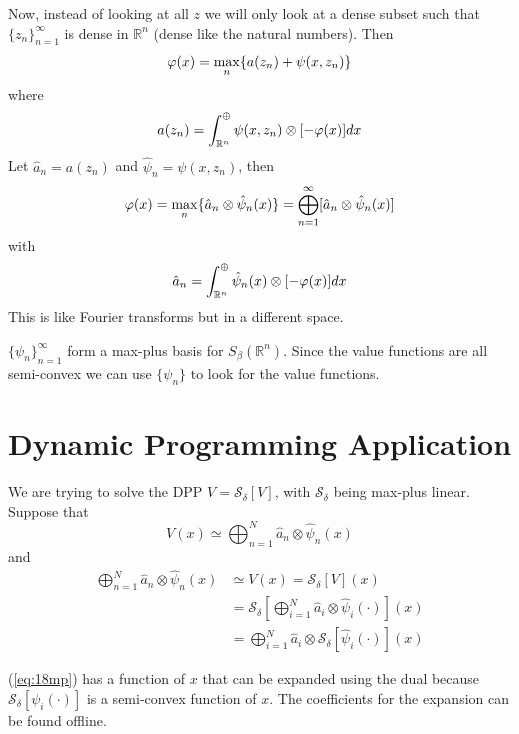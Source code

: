 Now, instead of looking at all $z$ we will only look at a dense subset such that ${\{z_n\}}_{n=1}^\infty$ is dense in $\mathbb{R}^n$ (dense like the natural numbers).
Then
$$\varphi(x) = \max_n\{a(z_n) + \psi(x,z_n)\}$$
where
$$a(z_n) = \int_{\mathbb{R}^n}^\oplus \psi(x,z_n)\otimes [-\varphi(x)]dx$$
Let $\hat{a}_n=a(z_n)$ and $\hat{\psi}_n=\psi(x,z_n)$, then
\begin{align}
\label{eq:18vpx}
\varphi(x) = \max_n\{\hat{a}_n\otimes\hat{\psi}_n(x)\} = \bigoplus_{n=1}^\infty[\hat{a}_n\otimes\hat{\psi}_n(x)]
\end{align}
with
$$\hat{a}_n = \int_{\mathbb{R}^n}^\oplus \hat{\psi}_n(x)\otimes [-\varphi(x)]dx$$
This is like Fourier transforms but in a different space.

${\{\psi_n\}}_{n=1}^\infty$ form a max-plus basis for $S_\beta(\mathbb{R}^n)$.
Since the value functions are all semi-convex we can use $\{\psi_n\}$ to look for the value functions.

\section{Dynamic Programming Application}
We are trying to solve the DPP $V=\mathcal{S}_\delta[V]$, with $\mathcal{S}_\delta$ being max-plus linear.
Suppose that
$$V(x)\simeq \bigoplus_{n=1}^N\hat{a}_n\otimes\hat{\psi}_n(x)$$
and
\begin{align}
\label{eq:18mp}
\bigoplus_{n=1}^N\hat{a}_n\otimes\hat{\psi}_n(x) &\simeq V(x) = \mathcal{S}_\delta[V](x) \nonumber \\
&= \mathcal{S}_\delta\left[\bigoplus_{i=1}^N\hat{a}_i\otimes\hat{\psi}_i(\cdot)\right](x) \nonumber \\
&= \bigoplus_{i=1}^N\hat{a}_i\otimes\mathcal{S}_\delta[\hat{\psi}_i(\cdot)](x)
\end{align}

(\ref{eq:18mp}) has a function of $x$ that can be expanded using the dual because $\mathcal{S}_\delta[\psi_i(\cdot)]$ is a semi-convex function of $x$.
The coefficients for the expansion can be found offline.

